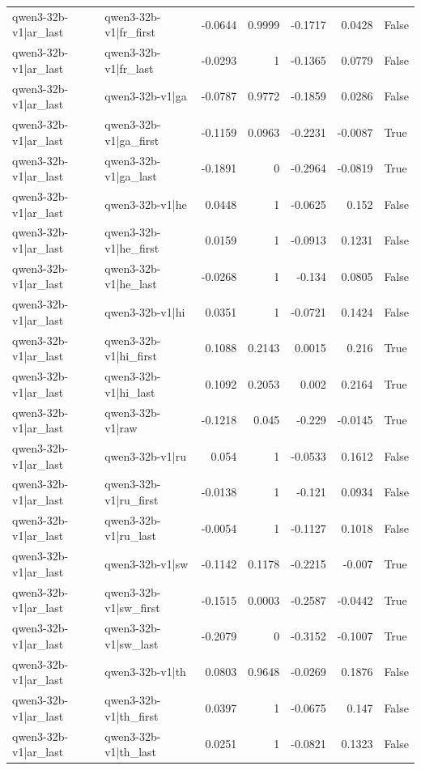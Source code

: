 \begin{table}
\begin{tabular}{l l r r r r l}
qwen3-32b-v1|ar_last & qwen3-32b-v1|fr_first & -0.0644 & 0.9999 & -0.1717 & 0.0428 & False \\
qwen3-32b-v1|ar_last & qwen3-32b-v1|fr_last & -0.0293 & 1 & -0.1365 & 0.0779 & False \\
qwen3-32b-v1|ar_last & qwen3-32b-v1|ga & -0.0787 & 0.9772 & -0.1859 & 0.0286 & False \\
qwen3-32b-v1|ar_last & qwen3-32b-v1|ga_first & -0.1159 & 0.0963 & -0.2231 & -0.0087 & True \\
qwen3-32b-v1|ar_last & qwen3-32b-v1|ga_last & -0.1891 & 0 & -0.2964 & -0.0819 & True \\
qwen3-32b-v1|ar_last & qwen3-32b-v1|he & 0.0448 & 1 & -0.0625 & 0.152 & False \\
qwen3-32b-v1|ar_last & qwen3-32b-v1|he_first & 0.0159 & 1 & -0.0913 & 0.1231 & False \\
qwen3-32b-v1|ar_last & qwen3-32b-v1|he_last & -0.0268 & 1 & -0.134 & 0.0805 & False \\
qwen3-32b-v1|ar_last & qwen3-32b-v1|hi & 0.0351 & 1 & -0.0721 & 0.1424 & False \\
qwen3-32b-v1|ar_last & qwen3-32b-v1|hi_first & 0.1088 & 0.2143 & 0.0015 & 0.216 & True \\
qwen3-32b-v1|ar_last & qwen3-32b-v1|hi_last & 0.1092 & 0.2053 & 0.002 & 0.2164 & True \\
qwen3-32b-v1|ar_last & qwen3-32b-v1|raw & -0.1218 & 0.045 & -0.229 & -0.0145 & True \\
qwen3-32b-v1|ar_last & qwen3-32b-v1|ru & 0.054 & 1 & -0.0533 & 0.1612 & False \\
qwen3-32b-v1|ar_last & qwen3-32b-v1|ru_first & -0.0138 & 1 & -0.121 & 0.0934 & False \\
qwen3-32b-v1|ar_last & qwen3-32b-v1|ru_last & -0.0054 & 1 & -0.1127 & 0.1018 & False \\
qwen3-32b-v1|ar_last & qwen3-32b-v1|sw & -0.1142 & 0.1178 & -0.2215 & -0.007 & True \\
qwen3-32b-v1|ar_last & qwen3-32b-v1|sw_first & -0.1515 & 0.0003 & -0.2587 & -0.0442 & True \\
qwen3-32b-v1|ar_last & qwen3-32b-v1|sw_last & -0.2079 & 0 & -0.3152 & -0.1007 & True \\
qwen3-32b-v1|ar_last & qwen3-32b-v1|th & 0.0803 & 0.9648 & -0.0269 & 0.1876 & False \\
qwen3-32b-v1|ar_last & qwen3-32b-v1|th_first & 0.0397 & 1 & -0.0675 & 0.147 & False \\
qwen3-32b-v1|ar_last & qwen3-32b-v1|th_last & 0.0251 & 1 & -0.0821 & 0.1323 & False \\

\end{tabular}
\end{table}
